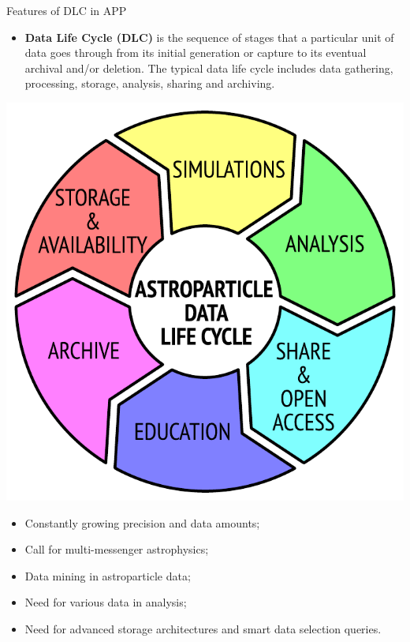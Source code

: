 \begin{frame}{Features of DLC in APP}
    \begin{itemize}
        \item \textbf{Data Life Cycle (DLC)} is the sequence of stages that a particular unit of data goes through from its initial generation 
        or capture to its eventual archival and/or deletion. The typical data life cycle includes data gathering, processing, storage, analysis, sharing and archiving. 
    \end{itemize}

    \begin{minipage}[c]{0.35\textwidth}
        \includegraphics[width=1\textwidth]{pics/ADLC.pdf}
    \end{minipage}
    \hfill
    \begin{minipage}[c]{0.64\textwidth}
        \begin{itemize}
            \item Constantly growing precision and data amounts;
            \item Call for multi-messenger astrophysics;
            \item Data mining in astroparticle data;
            \item Need for various data in analysis;
            \item Need for advanced storage architectures and smart data selection queries.
        \end{itemize}
    \end{minipage}
\end{frame}


